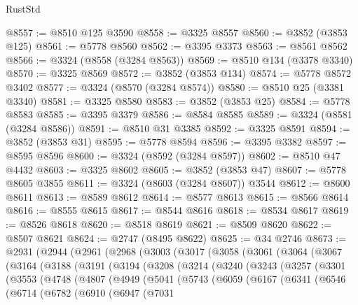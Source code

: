 \begin{lexlean}{RustStd}
\begin{coremodule}
@8557 := @8510 @125 @3590
@8558 := @3325 @8557
@8560 := @3852 (@3853 @125)
@8561 := @5778 @8560
@8562 := @3395 @3373
@8563 := @8561 @8562
@8566 := @3324 (@8558 (@3284 @8563))
@8569 := @8510 @134 (@3378 @3340)
@8570 := @3325 @8569
@8572 := @3852 (@3853 @134)
@8574 := @5778 @8572 @3402
@8577 := @3324 (@8570 (@3284 @8574))
@8580 := @8510 @25 (@3381 @3340)
@8581 := @3325 @8580
@8583 := @3852 (@3853 @25)
@8584 := @5778 @8583
@8585 := @3395 @3379
@8586 := @8584 @8585
@8589 := @3324 (@8581 (@3284 @8586))
@8591 := @8510 @31 @3385
@8592 := @3325 @8591
@8594 := @3852 (@3853 @31)
@8595 := @5778 @8594
@8596 := @3395 @3382
@8597 := @8595 @8596
@8600 := @3324 (@8592 (@3284 @8597))
@8602 := @8510 @47 @4432
@8603 := @3325 @8602
@8605 := @3852 (@3853 @47)
@8607 := @5778 @8605 @3855
@8611 := @3324 (@8603 (@3284 @8607)) @3544
@8612 := @8600 @8611
@8613 := @8589 @8612
@8614 := @8577 @8613
@8615 := @8566 @8614
@8616 := @8555 @8615
@8617 := @8544 @8616
@8618 := @8534 @8617
@8619 := @8526 @8618
@8620 := @8518 @8619
@8621 := @8509 @8620
@8622 := @8507 @8621
@8624 := @2747 (@8495 @8622)
@8625 := @34 @2746
@8673 := @2931
    (@2944
      (@2961
        (@2968
          (@3003
            (@3017
              (@3058
                (@3061
                  (@3064
                    (@3067
                      (@3164
                        (@3188
                          (@3191
                            (@3194
                              (@3208
                                (@3214
                                  (@3240
                                    (@3243
                                      (@3257
                                        (@3301
                                          (@3553
                                            (@4748
                                              (@4807
                                                (@4949
                                                  (@5041
                                                    (@5743
                                                      (@6059
                                                        (@6167
                                                          (@6341
                                                            (@6546
                                                              (@6714
                                                                (@6782
                                                                  (@6910
                                                                    (@6947
                                                                      (@7031

\end{coremodule}
\end{lexlean}
